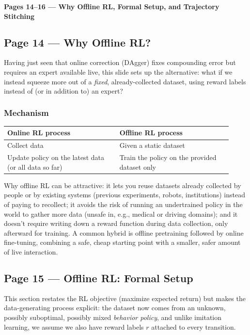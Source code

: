 \bigskip

\textbf{Pages 14--16 --- Why Offline RL, Formal Setup, and Trajectory Stitching}

\subsection*{Page 14 --- Why Offline RL?}

Having just seen that online correction (DAgger) fixes compounding error but requires an expert available live, this slide sets up the alternative: what if we instead squeeze more out of a \emph{fixed}, already-collected dataset, using reward labels instead of (or in addition to) an expert?

\subsubsection*{Mechanism}

\begin{center}
\begin{tabular}{@{}p{0.46\linewidth}p{0.46\linewidth}@{}}
\toprule
Online RL process & Offline RL process \\
\midrule
Collect data & Given a static dataset \\
Update policy on the latest data (or all data so far) & Train the policy on the provided dataset only \\
\bottomrule
\end{tabular}
\end{center}

Why offline RL can be attractive: it lets you reuse datasets already collected by people or by existing systems (previous experiments, robots, institutions) instead of paying to recollect; it avoids the risk of running an undertrained policy in the world to gather more data (unsafe in, e.g., medical or driving domains); and it doesn't require writing down a reward function during data collection, only afterward for training. A common hybrid is offline pretraining followed by online fine-tuning, combining a safe, cheap starting point with a smaller, safer amount of live interaction.

\subsection*{Page 15 --- Offline RL: Formal Setup}

This section restates the RL objective (maximize expected return) but makes the data-generating process explicit: the dataset now comes from an unknown, possibly suboptimal, possibly mixed \emph{behavior policy}, and unlike imitation learning, we assume we also have reward labels $r$ attached to every transition.

